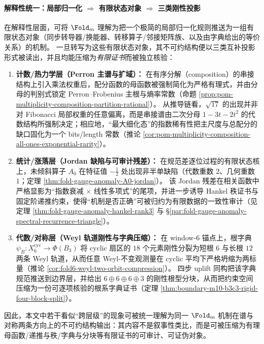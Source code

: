 \paragraph{解释性统一：局部归一化 \texorpdfstring{$\Rightarrow$}{=>} 有限状态对象 \texorpdfstring{$\Rightarrow$}{=>} 三类刚性投影}
在解释性层面，可将 \(\Fold_m\) 理解为把一个极简的局部归一化规则推送为一组有限状态对象（同步转导器/换能器、转移算子/邻接矩阵族、以及由字典给出的等价关系）的机制。
一旦转写为这些有限状态对象，其不可约结构便以三类互补投影形式被读出，并且均能压缩为\emph{有限证书}而被独立核验：
\begin{enumerate}
  \item \textbf{计数/热力学层（Perron 主谱与扩域）：}
  在有序分解（composition）的串接结构上引入乘法权重后，配分函数的母函数被强制简化为严格有理式，并由分母的判别式锁定 Perron--Frobenius 主根与熵率常数（命题 \ref{prop:pom-multiplicity-composition-partition-rational}）。
  从推导链看，\(\sqrt{17}\) 的出现并非对 Fibonacci 局部权重的任意偏离，而是串接谱由二次分母 \(1-3t-2t^2\) 的代数结构所强制决定；相应地，“最大细化态”的指数稀有性把主尺度与总配分的缺口固化为一个 bits/length 常数（推论 \ref{cor:pom-multiplicity-composition-all-ones-exponential-rarity}）。
  \item \textbf{统计/涨落层（Jordan 缺陷与可审计残差）：}
  在规范差逐位过程的有限状态核上，未倾斜算子 \(A_0\) 在特征值 \(-\tfrac12\) 处出现非半单缺陷（代数重数 \(2\)、几何重数 \(1\)；定理 \ref{thm:fold-gauge-anomaly-A0-jordan}）。
  该 Jordan 残差在相关函数中严格显影为“指数衰减 \(\times\) 线性多项式”的尾项，并进一步诱导 Hankel 秩证书与固定阶递推约束，使得“机制是否正确”可被归约为有限数据的一致性审计（见定理 \ref{thm:fold-gauge-anomaly-hankel-rank3} 与 \S\ref{par:fold-gauge-anomaly-spectral-recurrence-triangle}）。
  \item \textbf{代数/对称层（Weyl 轨道刚性与字典压缩）：}
  在 window-\(6\) 锚点上，根字典 \(\psi_B:X_6^{\mathrm{cyc}}\to\Phi(B_3)\) 将 cyclic 扇区的 \(18\) 个元素刚性分裂为短根 \(6\) 与长根 \(12\) 两条 Weyl 轨道，从而任意 Weyl-不变观测量在 cyclic 平均下严格坍缩为两标量（推论 \ref{cor:fold6-weyl-two-orbit-compression}）。
  四步 uplift 同构把该字典规范推送到边界层，并给出 \(6\oplus 6\oplus 6\oplus 3\) 的刚性根型分块，从而把约束空间压缩为一份可逐项核验的根系字典证书（定理 \ref{thm:boundary-m10-b3c3-rigid-four-block-split}）。
\end{enumerate}
因此，本文中若干看似“跨层级”的现象可被统一理解为同一 \(\Fold_m\) 机制在谱与对称两条方向上的不可约结构输出：其内容不是叙事性类比，而是可被压缩为有理母函数/递推与秩/字典与分块等有限证书的可审计、可证伪对象。
